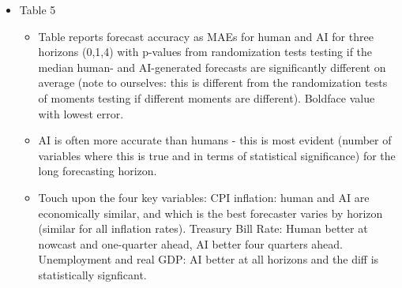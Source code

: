 \documentclass{article}
\begin{document}
\begin{itemize}
\begin{itemize}
\begin{itemize}
            \end{itemize}
            \item Thus, AI cannot quantitatively mimic/replace human forecasters.
            \item But, many of the differences are not economically different. Point out CPI Inflation Rate, Treasury Bill Rate (3M), Unemployment Rate, Real GDP (200 median difference, but the median of the data is 13000). 
            \item For these four emphasized variables, Figure 6 shows time-series plots of median AI and human forecasts, underscoring that the forecasts are similar. Discuss the differences (AI more variable than human for CPI, human predict lift-off from zero-lower bound for interest rate whereas AI does not, humans predict higher unemployment rate during crises than AI). 
            \item Also, Figure 7 show density plots for these four variables in normal and crisis times. In some cases they are very similar, in others, big differences. The periods where they are different do not always align with uncertain periods - it looks like there is no pattern really.
            \item Finally, note huge differences (in magnitude, relative to descriptive stats) for Real PCE.  
        \end{itemize}
    \item Table 5
        \begin{itemize}
            \item Table reports forecast accuracy as MAEs for human and AI for three horizons (0,1,4) with p-values from randomization tests testing if the median human- and AI-generated forecasts are significantly different on average (note to ourselves: this is different from the randomization tests of moments testing if different moments are different). Boldface value with lowest error.
            \item AI is often more accurate than humans - this is most evident (number of variables where this is true and in terms of statistical significance) for the long forecasting horizon. 
            \item Touch upon the four key variables: CPI inflation: human and AI are economically similar, and which is the best forecaster varies by horizon (similar for all inflation rates). Treasury Bill Rate: Human better at nowcast and one-quarter ahead, AI better four quarters ahead. Unemployment and real GDP: AI better at all horizons and the diff is statistically signficant. 

\end{itemize}
\end{itemize}
\end{document}
